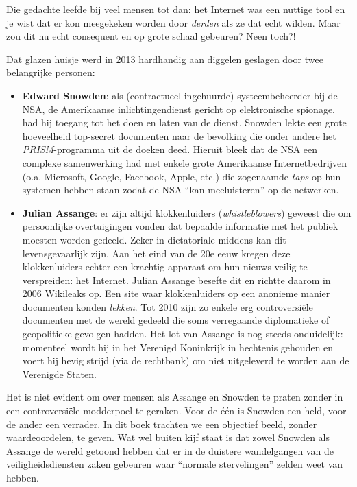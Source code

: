 \documentclass[
  10pt,
  dutch,
  paper=a4,
  ,captions=tableheading
]{scrbook}
\providecommand{\tightlist}{%
  \setlength{\itemsep}{0pt}\setlength{\parskip}{0pt}}
\begin{document}
Die gedachte leefde bij veel mensen tot dan: het Internet was een
nuttige tool en je wist dat er kon meegekeken worden door \emph{derden}
als ze dat echt wilden. Maar zou dit nu echt consequent en op grote
schaal gebeuren? Neen toch?!

Dat glazen huisje werd in 2013 hardhandig aan diggelen geslagen door
twee belangrijke personen:

\begin{itemize}
\tightlist
\item
  \textbf{Edward Snowden}: als (contractueel ingehuurde)
  systeembeheerder bij de NSA, de Amerikaanse inlichtingendienst gericht
  op elektronische spionage, had hij toegang tot het doen en laten van
  de dienst. Snowden lekte een grote hoeveelheid top-secret documenten
  naar de bevolking die onder andere het \emph{PRISM}-programma uit de
  doeken deed. Hieruit bleek dat de NSA een complexe samenwerking had
  met enkele grote Amerikaanse Internetbedrijven (o.a. Microsoft,
  Google, Facebook, Apple, etc.) die zogenaamde \emph{taps} op hun
  systemen hebben staan zodat de NSA ``kan meeluisteren'' op de
  netwerken.
\item
  \textbf{Julian Assange}: er zijn altijd klokkenluiders
  (\emph{whistleblowers}) geweest die om persoonlijke overtuigingen
  vonden dat bepaalde informatie met het publiek moesten worden gedeeld.
  Zeker in dictatoriale middens kan dit levensgevaarlijk zijn. Aan het
  eind van de 20e eeuw kregen deze klokkenluiders echter een krachtig
  apparaat om hun nieuws veilig te verspreiden: het Internet. Julian
  Assange besefte dit en richtte daarom in 2006 Wikileaks op. Een site
  waar klokkenluiders op een anonieme manier documenten konden
  \emph{lekken}. Tot 2010 zijn zo enkele erg controversiële documenten
  met de wereld gedeeld die soms verregaande diplomatieke of
  geopolitieke gevolgen hadden. Het lot van Assange is nog steeds
  onduidelijk: momenteel wordt hij in het Verenigd Koninkrijk in
  hechtenis gehouden en voert hij hevig strijd (via de rechtbank) om
  niet uitgeleverd te worden aan de Verenigde Staten.
\end{itemize}

\begin{cautionblock}
Het is niet evident om over mensen als Assange en Snowden te praten
zonder in een controversiële modderpoel te geraken. Voor de één is
Snowden een held, voor de ander een verrader. In dit boek trachten we
een objectief beeld, zonder waardeoordelen, te geven. Wat wel buiten
kijf staat is dat zowel Snowden als Assange de wereld getoond hebben dat
er in de duistere wandelgangen van de veiligheidsdiensten zaken gebeuren
waar ``normale stervelingen'' zelden weet van hebben.
\end{cautionblock}
\end{document}
